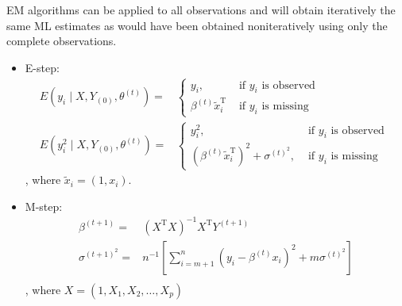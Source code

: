 \begin{example}
    EM algorithms can be applied to all observations and will obtain iteratively the same ML estimates as would have been obtained noniteratively using only the complete observations.

    \begin{itemize}
        \item E-step:
              \begin{equation}
                  \begin{aligned}
                      E\left(y_{i} \mid X, Y_{(0)}, \theta^{(t)}\right)=     & \left\{\begin{array}{ll}
                                                                                          y_{i},                                 & \text { if } y_{i} \text { is observed } \\
                                                                                          \beta^{(t)} \tilde{x}_{i}^{\mathrm{T}} & \text { if } y_{i} \text { is missing }
                                                                                      \end{array}\right.                                                                                                          \\
                      E\left(y_{i}^{2} \mid X, Y_{(0)}, \theta^{(t)}\right)= & \left\{\begin{array}{ll}
                                                                                          y_{i}^{2},                                                                & \text { if } y_{i} \text { is observed } \\
                                                                                          \left(\beta^{(t)} \tilde{x}_{i}^{\mathrm{T}}\right)^{2}+\sigma^{(t)^{2}}, & \text { if } y_{i} \text { is missing }
                                                                                      \end{array}\right.
                  \end{aligned}
              \end{equation}
              , where $\tilde{x}_{i}=(1,x_{i})$.
        \item M-step:
              \begin{equation}
                  \begin{aligned}
                      \beta^{(t+1)}=      & \left(X^{\mathrm{T}} X\right)^{-1} X^{\mathrm{T}} Y^{(t+1)}                                    \\
                      \sigma^{(t+1)^{2}}= & n^{-1}\left[\sum_{i=m+1}^{n}\left(y_{i}-\beta^{(t)} x_{i}\right)^{2}+m \sigma^{(t)^{2}}\right] \\
                  \end{aligned}
              \end{equation}
              , where $X=(1,X_1,X_2,\ldots,X_p)$
    \end{itemize}
\end{example}

